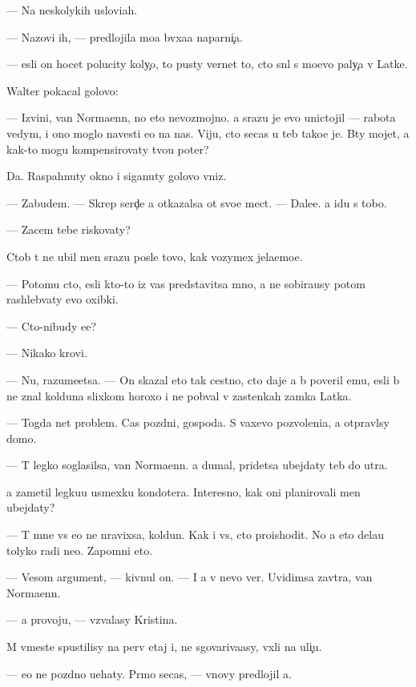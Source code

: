\documentclass[10pt]{book}
\begin{document}
— Na neskolykih uslovi{\y}ah.

— Nazovi ih, — predlojila mo{\y}a b{\yi}vxa{\y}a naparni{\c}a.

— {\Y}esli on hocet polucity koly{\c}o, to pusty vernet to, cto sn{\ia}l s mo{\y}evo paly{\c}a v Latke.

Walter pokacal golovo{\y}:

— Izvini, van Normaenn, no eto nevozmojno. {\Y}a srazu je {\y}evo unictojil — rabota vedym{\yi}, i ono moglo navesti {\y}e{\y}o na nas. Viju, cto se{\y}cas u teb{\ia} tako{\y}e je. B{\yi}ty mojet, {\y}a kak-to mogu kompensirovaty tvo{\y}u poter{\iu}?

Da. Raspahnuty okno i siganuty golovo{\y} vniz.

— Zabudem. — Skrep{\ia} serd{\c}e {\y}a otkazalsa ot svo{\y}e{\y} mect{\yi}. — Dale{\y}e. {\Y}a idu s tobo{\y}.

— Zacem tebe riskovaty?

Ctob{\yi} t{\yi} ne ubil men{\ia} srazu posle tovo, kak vozymex jela{\y}emo{\y}e.

— Potomu cto, {\y}esli kto-to iz vas predstavitsa mno{\y}, {\y}a ne sobira{\y}usy potom rashleb{\yi}vaty {\y}evo oxibki.

— Cto-nibudy {\y}e{\x}e?

— Nikako{\y} krovi.

— Nu, razume{\y}etsa. — On skazal eto tak cestno, cto daje {\y}a b{\yi} poveril {\y}emu, {\y}esli b{\yi} ne znal kolduna slixkom horoxo i ne pob{\yi}val v zastenkah zamka Latka.

— Togda net problem. Cas pozdni{\y}, gospoda. S vaxevo pozvoleni{\y}a, {\y}a otpravl{\iu}sy domo{\y}.

— T{\yi} legko soglasilsa, van Normaenn. {\Y}a dumal, pridetsa ubejdaty teb{\ia} do utra.

{\Y}a zametil legku{\y}u usmexku kondot{\y}era. Interesno, kak oni planirovali men{\ia} ubejdaty?

— T{\yi} mne vs{\e} {\y}e{\x}o ne nravixsa, koldun. Kak i vs{\e}, cto proishodit. No {\y}a eto dela{\y}u tolyko radi ne{\y}o. Zapomni eto.

— Vesom{\yi}{\y} argument, — kivnul on. — I {\y}a v nevo ver{\iu}. Uvidimsa zavtra, van Normaenn.

— {\Y}a provoju, — v{\yi}zvalasy Kristina.

M{\yi} vmeste spustilisy na perv{\yi}{\y} etaj i, ne sgovariva{\y}asy, v{\yi}xli na uli{\c}u.

— {\Y}e{\x}o ne pozdno u{\y}ehaty. Pr{\ia}mo se{\y}cas, — vnovy predlojil {\y}a.
\end{document}
